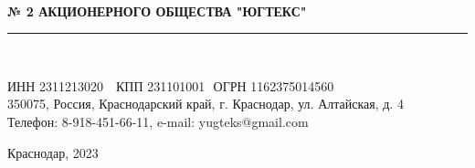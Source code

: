\setcounter{page}{1}

\begin{center}
	\Large\textbf{
		\\[-1.5mm]
		№ 2 АКЦИОНЕРНОГО ОБЩЕСТВА "ЮГТЕКС"\\[-6mm]}
	\noindent\rule{\textwidth-10mm}{1pt}\\[-10mm]  %
\end{center}
\vspace{-6mm}
\begin{center}
		{\small{ИНН 2311213020 \,\, КПП 231101001\,\,
			ОГРН 1162375014560\\[-2mm]350075}{, Россия, Краснодарский край, г. Краснодар, ул. Алтайская, д. 4 \\[-2mm]
			Телефон:  8-918-451-66-11, e-mail: yugteks@gmail.com}}
	\\[8mm]
\end{center}

\begin{flushright}
	Краснодар, 2023    \\[1mm]
\end{flushright}

